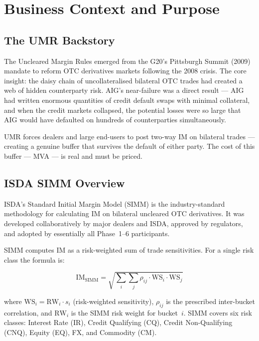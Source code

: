 \documentclass[11pt,a4paper]{article}
\begin{document}
\section{Business Context and Purpose}

\subsection{The UMR Backstory}

The Uncleared Margin Rules emerged from the G20's Pittsburgh Summit (2009) mandate to reform
OTC derivatives markets following the 2008 crisis. The core insight: the daisy chain of
uncollateralised bilateral OTC trades had created a web of hidden counterparty risk. AIG's
near-failure was a direct result --- AIG had written enormous quantities of credit default swaps
with minimal collateral, and when the credit markets collapsed, the potential losses were so
large that AIG would have defaulted on hundreds of counterparties simultaneously.

UMR forces dealers and large end-users to post two-way IM on bilateral trades --- creating a
genuine buffer that survives the default of either party. The cost of this buffer --- MVA ---
is real and must be priced.

\subsection{ISDA SIMM Overview}

ISDA's Standard Initial Margin Model (SIMM) is the industry-standard methodology for
calculating IM on bilateral uncleared OTC derivatives. It was developed collaboratively by
major dealers and ISDA, approved by regulators, and adopted by essentially all Phase~1--6
participants.

SIMM computes IM as a risk-weighted sum of trade sensitivities. For a single risk class the
formula is:

\begin{equation}
\mathrm{IM}_{\mathrm{SIMM}} = \sqrt{\sum_i \sum_j \rho_{ij}\cdot \mathrm{WS}_i\cdot\mathrm{WS}_j}
\tag{2}
\end{equation}

where $\mathrm{WS}_i = \mathrm{RW}_i \cdot s_i$ (risk-weighted sensitivity), $\rho_{ij}$ is
the prescribed inter-bucket correlation, and $\mathrm{RW}_i$ is the SIMM risk weight for
bucket~$i$. SIMM covers six risk classes: Interest Rate (IR), Credit Qualifying (CQ), Credit
Non-Qualifying (CNQ), Equity (EQ), FX, and Commodity (CM).
\end{document}
